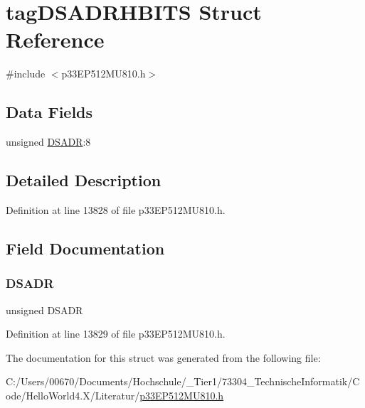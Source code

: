 \hypertarget{structtag_d_s_a_d_r_h_b_i_t_s}{}\section{tag\+D\+S\+A\+D\+R\+H\+B\+I\+TS Struct Reference}
\label{structtag_d_s_a_d_r_h_b_i_t_s}


{\ttfamily \#include $<$p33\+E\+P512\+M\+U810.\+h$>$}

\subsection*{Data Fields}
\begin{DoxyCompactItemize}
\item 
unsigned \hyperlink{structtag_d_s_a_d_r_h_b_i_t_s_ac838566a37b16a38ab17d17e307239e7}{D\+S\+A\+DR}\+:8
\end{DoxyCompactItemize}


\subsection{Detailed Description}


Definition at line 13828 of file p33\+E\+P512\+M\+U810.\+h.



\subsection{Field Documentation}
\mbox{\label{structtag_d_s_a_d_r_h_b_i_t_s_ac838566a37b16a38ab17d17e307239e7}} 
\subsubsection{\texorpdfstring{D\+S\+A\+DR}{DSADR}}
{\footnotesize\ttfamily unsigned D\+S\+A\+DR}



Definition at line 13829 of file p33\+E\+P512\+M\+U810.\+h.



The documentation for this struct was generated from the following file\+:\begin{DoxyCompactItemize}
\item 
C\+:/\+Users/00670/\+Documents/\+Hochschule/\+\_\+\+Tier1/73304\+\_\+\+Technische\+Informatik/\+Code/\+Hello\+World4.\+X/\+Literatur/\hyperlink{p33_e_p512_m_u810_8h}{p33\+E\+P512\+M\+U810.\+h}\end{DoxyCompactItemize}
